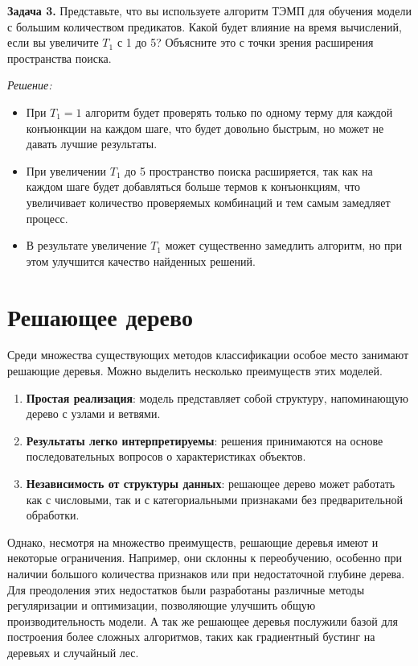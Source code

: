 \textbf{Задача 3.}
\newline
Представьте, что вы используете алгоритм ТЭМП для обучения модели с большим количеством предикатов. Какой будет влияние на время вычислений, если вы увеличите $T_1$ с 1 до 5? Объясните это с точки зрения расширения пространства поиска.

\textit{Решение:}
\begin{itemize}
    \item При $T_1 = 1$ алгоритм будет проверять только по одному терму для каждой конъюнкции на каждом шаге, что будет довольно быстрым, но может не давать лучшие результаты.
    \item При увеличении $T_1$ до 5 пространство поиска расширяется, так как на каждом шаге будет добавляться больше термов к конъюнкциям, что увеличивает количество проверяемых комбинаций и тем самым замедляет процесс.
    \item В результате увеличение $T_1$ может существенно замедлить алгоритм, но при этом улучшится качество найденных решений.
\end{itemize}

\section{Решающее дерево}
Среди множества существующих методов классификации особое место занимают решающие деревья.
Можно выделить несколько преимуществ этих моделей.
\begin{enumerate}
    \item \textbf{Простая реализация}: модель представляет собой структуру, напоминающую дерево с узлами и ветвями.
    \item \textbf{Результаты легко интерпретируемы}: решения принимаются на основе последовательных вопросов о характеристиках объектов.
    \item \textbf{Независимость от структуры данных}: решающее дерево может работать как с числовыми, так и с категориальными признаками без предварительной обработки.

\end{enumerate}
Однако, несмотря на множество преимуществ, решающие деревья имеют и некоторые ограничения. Например, они склонны к переобучению, особенно при наличии большого количества признаков или при недостаточной глубине дерева.
Для преодоления этих недостатков были разработаны различные методы регуляризации и оптимизации, позволяющие улучшить общую производительность модели. А так же решающее деревья послужили базой для построения более сложных алгоритмов, таких как градиентный бустинг на деревьях и случайный лес.

